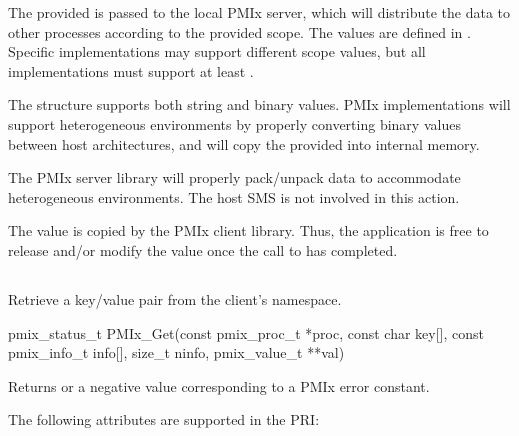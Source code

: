 The provided  is passed to the local PMIx server, which will distribute the data to other processes according to the provided scope.
The  values are defined in .
Specific implementations may support different scope values, but all implementations must support at least .

The  structure supports both string and binary values.
PMIx implementations will support heterogeneous environments by properly converting binary values between host architectures, and will copy the provided  into internal memory.

\adviceimplstart
The PMIx server library will properly pack/unpack data to accommodate heterogeneous environments. The host \ac{SMS} is not involved in this action.
\adviceimplend

\adviceuserstart
The value is copied by the PMIx client library.
Thus, the application is free to release and/or modify the value once the call to  has completed.
\adviceuserend


\subsection{}

\summary

Retrieve a key/value pair from the client's namespace.

\format

\cspecificstart
\begin{codepar}
pmix_status_t
PMIx_Get(const pmix_proc_t *proc, const char key[],
         const pmix_info_t info[], size_t ninfo,
         pmix_value_t **val)
\end{codepar}
\cspecificend

\begin{arglist}
\end{arglist}

Returns  or a negative value corresponding to a PMIx error constant.

\priattr
The following attributes are supported in the \ac{PRI}:




